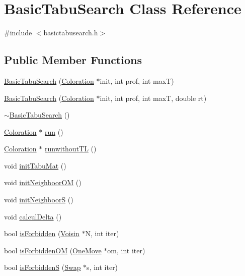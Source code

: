 \hypertarget{classBasicTabuSearch}{\section{Basic\-Tabu\-Search Class Reference}
\label{classBasicTabuSearch}
}


{\ttfamily \#include $<$basictabusearch.\-h$>$}

\subsection*{Public Member Functions}
\begin{DoxyCompactItemize}
\item 
\hyperlink{classBasicTabuSearch_ad337416172ee1239d0746c3a38d83111}{Basic\-Tabu\-Search} (\hyperlink{classColoration}{Coloration} $\ast$init, int prof, int max\-T)
\item 
\hyperlink{classBasicTabuSearch_a8970cf33166ad5040097612f0809a5e6}{Basic\-Tabu\-Search} (\hyperlink{classColoration}{Coloration} $\ast$init, int prof, int max\-T, double rt)
\item 
\hyperlink{classBasicTabuSearch_ad4449024a20e6609dd20884696356c8a}{$\sim$\-Basic\-Tabu\-Search} ()
\item 
\hyperlink{classColoration}{Coloration} $\ast$ \hyperlink{classBasicTabuSearch_a439b45b01e2fb3c39668deaabdce6945}{run} ()
\item 
\hyperlink{classColoration}{Coloration} $\ast$ \hyperlink{classBasicTabuSearch_aabfc4bb46420567ca0a5bc712e82906d}{runwithout\-T\-L} ()
\item 
void \hyperlink{classBasicTabuSearch_ae51343045059a6e810b962429b8928d6}{init\-Tabu\-Mat} ()
\item 
void \hyperlink{classBasicTabuSearch_aa64a2c376b8e8c594163c1967126bb15}{init\-Neighboor\-O\-M} ()
\item 
void \hyperlink{classBasicTabuSearch_ae84e184edf1ef484d53107759433613b}{init\-Neighboor\-S} ()
\item 
void \hyperlink{classBasicTabuSearch_a14a157e898bba846f3b00f25b7c64fe2}{calcul\-Delta} ()
\item 
bool \hyperlink{classBasicTabuSearch_aa88417b74f0d99d694309226306eedef}{is\-Forbidden} (\hyperlink{classVoisin}{Voisin} $\ast$N, int iter)
\item 
bool \hyperlink{classBasicTabuSearch_af4f4afee741e09940ea4b8c47468613a}{is\-Forbidden\-O\-M} (\hyperlink{classOneMove}{One\-Move} $\ast$om, int iter)
\item 
bool \hyperlink{classBasicTabuSearch_a6d5c0de432bfe36a379e0cdb52457728}{is\-Forbidden\-S} (\hyperlink{classSwap}{Swap} $\ast$s, int iter)
\end{DoxyCompactItemize}


